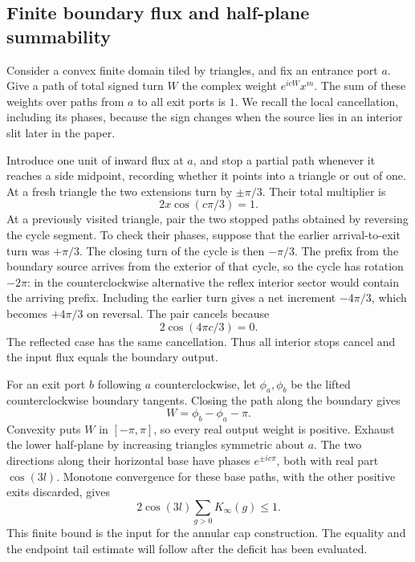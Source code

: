 \subsection{Finite boundary flux and half-plane summability}

Consider a convex finite domain tiled by triangles, and fix an entrance
port \(a\).  Give a path of total signed turn \(W\) the complex weight
\(e^{icW}x^m\).  The sum of these weights over paths from \(a\) to all
exit ports is \(1\).  We recall the local cancellation, including its
phases, because the sign changes when the source lies in an interior
slit later in the paper.

Introduce one unit of inward flux at \(a\), and stop a partial path
whenever it reaches a side midpoint, recording whether it points into
a triangle or out of one.  At a fresh triangle the two extensions turn
by \(\pm\pi/3\).  Their total multiplier is
\[
 2x\cos(c\pi/3)=1.
\]
At a previously visited triangle, pair the two stopped paths obtained
by reversing the cycle segment.  To check their phases, suppose that
the earlier arrival-to-exit turn was \(+\pi/3\).  The closing turn of
the cycle is then \(-\pi/3\).  The prefix from the boundary source
arrives from the exterior of that cycle, so the cycle has rotation
\(-2\pi\): in the counterclockwise alternative the reflex interior
sector would contain the arriving prefix.  Including the earlier turn
gives a net increment \(-4\pi/3\), which becomes \(+4\pi/3\) on
reversal.  The pair cancels because
\[
 2\cos(4\pi c/3)=0.
\]
The reflected case has the same cancellation.  Thus all interior
stops cancel and the input flux equals the boundary output.

For an exit port \(b\) following \(a\) counterclockwise, let
\(\phi_a,\phi_b\) be the lifted counterclockwise boundary tangents.
Closing the path along the boundary gives
\[
 W=\phi_b-\phi_a-\pi.
\]
Convexity puts \(W\) in \([-\pi,\pi]\), so every real output weight is
positive.  Exhaust the lower half-plane by increasing triangles
symmetric about \(a\).  The two directions along their horizontal
base have phases \(e^{\pm ic\pi}\), both with real part
\(\cos(3l)\).  Monotone convergence for these base paths, with the
other positive exits discarded, gives
\begin{equation}\label{eq:cyl-half-plane}
 2\cos(3l)\sum_{g>0}K_\infty(g)\le1.
\end{equation}
This finite bound is the input for the annular cap construction.  The
equality and the endpoint tail estimate will follow after the deficit
has been evaluated.

